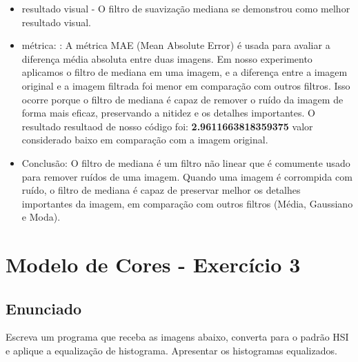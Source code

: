 \documentclass[10pt,a4paper]{article}
\begin{document}
\begin{itemize}
    \item {\ttfamily resultado visual} - O filtro de suavização mediana se demonstrou como melhor resultado visual.
    \item {\ttfamily métrica:}  : A métrica MAE (Mean Absolute Error) é usada para avaliar a diferença média absoluta entre duas imagens. Em nosso experimento aplicamos o filtro de mediana em uma imagem, e a diferença entre a imagem original e a imagem filtrada  foi menor em comparação com outros filtros. Isso ocorre porque o filtro de mediana é capaz de remover o ruído da imagem de forma mais eficaz, preservando a nitidez e os detalhes importantes. O resultado resultaod de nosso código foi: \textbf{2.9611663818359375} valor considerado baixo em comparação com a imagem original.
    \item {\ttfamily Conclusão:}  O filtro de mediana é um filtro não linear que é comumente usado para remover ruídos de uma imagem. Quando uma imagem é corrompida com ruído, o filtro de mediana é capaz de preservar melhor os detalhes importantes da imagem, em comparação com outros filtros (Média, Gaussiano e Moda).
\end{itemize}

\pagebreak

\section{Modelo de Cores - Exercício 3}

\subsection{Enunciado}

\begin{flushleft}
Escreva um programa que receba as imagens abaixo, converta para o padrão HSI e aplique a equalização de histograma. Apresentar os histogramas equalizados.
\end{flushleft}
\end{document}

